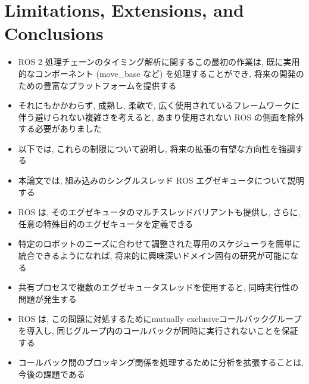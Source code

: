 
\section{Limitations, Extensions, and Conclusions}
\label{sec: limitations, extensions, and conclusions}

\begin{frame}{}
    \begin{itemize}
        \item ROS 2 処理チェーンのタイミング解析に関するこの最初の作業は, 既に実用的なコンポーネント (move\_base など) を処理することができ, 将来の開発のための豊富なプラットフォームを提供する
\item それにもかかわらず, 成熟し, 柔軟で, 広く使用されているフレームワークに伴う避けられない複雑さを考えると, あまり使用されない ROS の側面を除外する必要がありました
\item 以下では, これらの制限について説明し, 将来の拡張の有望な方向性を強調する
    \end{itemize}
\end{frame}

\begin{frame}{}
    \begin{itemize}
        \item 本論文では, 組み込みのシングルスレッド ROS エグゼキュータについて説明する
\item ROS は, そのエグゼキュータのマルチスレッドバリアントも提供し, さらに, 任意の特殊目的のエグゼキュータを定義できる
\item 特定のロボットのニーズに合わせて調整された専用のスケジューラを簡単に統合できるようになれば, 将来的に興味深いドメイン固有の研究が可能になる
\item 共有プロセスで複数のエグゼキュータスレッドを使用すると, 同時実行性の問題が発生する
\item ROS は, この問題に対処するためにmutually exclusiveコールバックグループを導入し, 同じグループ内のコールバックが同時に実行されないことを保証する
\item コールバック間のブロッキング関係を処理するために分析を拡張することは, 今後の課題である
    \end{itemize}
\end{frame}

